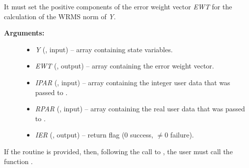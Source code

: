 \documentclass[letterpaper,10pt,english]{sphinxmanual}
\begin{document}
\begin{fulllineitems}
\label{f_interface/Usage:f/_/FARKEWT}
It must set the positive components of the error weight
vector \emph{EWT} for the calculation of the WRMS norm of \emph{Y}.
\begin{description}
\item[{\textbf{Arguments:}}] \leavevmode\begin{itemize}
\item {} 
\emph{Y} (, input) -- array containing state variables.

\item {} 
\emph{EWT} (, output) -- array containing the error weight vector.

\item {} 
\emph{IPAR} (, input) -- array containing the integer user data that was passed
to {\hyperref[f_interface/Usage:f/_/FARKMALLOC]{}}.

\item {} 
\emph{RPAR} (, input) -- array containing the real user data that was passed to
{\hyperref[f_interface/Usage:f/_/FARKMALLOC]{}}.

\item {} 
\emph{IER} (, output) -- return flag (0 success, $\ne 0$ failure).

\end{itemize}

\end{description}

\end{fulllineitems}


If the {\hyperref[f_interface/Usage:f/_/FARKEWT]{}} routine is provided, then, following the
call to {\hyperref[f_interface/Usage:f/_/FARKMALLOC]{}}, the user must call the function
{\hyperref[f_interface/Usage:f/_/FARKEWTSET]{}}.
\end{document}
